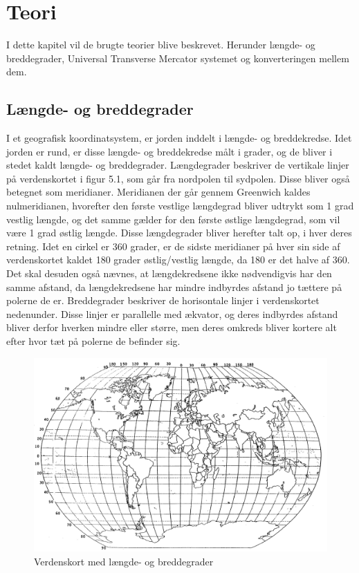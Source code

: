 \chapter{Teori} %
I dette kapitel vil de brugte teorier blive beskrevet. Herunder længde- og breddegrader, Universal Transverse Mercator systemet og konverteringen mellem dem. 

\section{Længde- og breddegrader}
I et geografisk koordinatsystem, er jorden inddelt i længde- og breddekredse. Idet jorden er rund, er disse længde- og breddekredse målt i grader, og de bliver i stedet kaldt længde- og breddegrader. \newline
Længdegrader beskriver de vertikale linjer på verdenskortet i figur 5.1, som går fra nordpolen til sydpolen. Disse bliver også betegnet som meridianer. Meridianen der går gennem Greenwich kaldes nulmeridianen, hvorefter den første vestlige længdegrad bliver udtrykt som 1 grad vestlig længde, og det samme gælder for den første østlige længdegrad, som vil være 1 grad østlig længde. Disse længdegrader bliver herefter talt op, i hver deres retning. Idet en cirkel er 360 grader, er de sidste meridianer på hver sin side af verdenskortet kaldet 180 grader østlig/vestlig længde, da 180 er det halve af 360. Det skal desuden også nævnes, at længdekredsene ikke nødvendigvis har den samme afstand, da længdekredsene har mindre indbyrdes afstand jo tættere på polerne de er. \newline
Breddegrader beskriver de horisontale linjer i verdenskortet nedenunder. Disse linjer er parallelle med ækvator, og deres indbyrdes afstand bliver derfor hverken mindre eller større, men deres omkreds bliver kortere alt efter hvor tæt på polerne de befinder sig.
\begin{figure} [h]
	\centering
	\includegraphics[width=.5\textwidth]{billeder/longlatmap}
	\caption{Verdenskort med længde- og breddegrader}
\end{figure}
